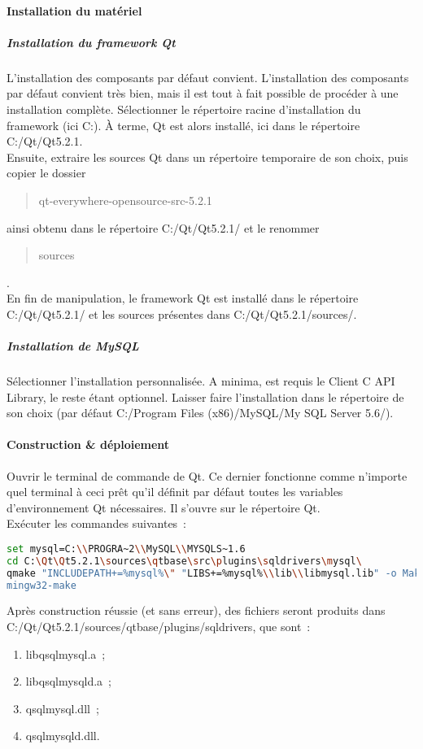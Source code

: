 \paragraph{Installation du matériel}
\subparagraph{Installation du framework Qt}
L'installation des composants par défaut convient.
L'installation des composants par défaut convient très bien, mais il est tout à fait possible de procéder à une installation complète.
Sélectionner le répertoire racine d'installation du framework (ici C:).
À terme, Qt est alors installé, ici dans le répertoire C:/Qt/Qt5.2.1.
\\
Ensuite, extraire les sources Qt dans un répertoire temporaire de son choix, puis copier le dossier \begin{quote}qt-everywhere-opensource-src-5.2.1\end{quote} ainsi obtenu dans le répertoire C:/Qt/Qt5.2.1/ et le renommer \begin{quote}sources\end{quote}.
\\
En fin de manipulation, le framework Qt est installé dans le répertoire C:/Qt/Qt5.2.1/ et les sources présentes dans C:/Qt/Qt5.2.1/sources/.

\subparagraph{Installation de MySQL}
Sélectionner l'installation personnalisée.
A minima, est requis le {\quote Client C API Library}, le reste étant optionnel.
Laisser faire l'installation dans le répertoire de son choix (par défaut C:/Program Files (x86)/MySQL/My SQL Server 5.6/).

\paragraph{Construction \& déploiement}
Ouvrir le terminal de commande de Qt.
Ce dernier fonctionne comme n'importe quel terminal à ceci prêt qu'il définit par défaut toutes les variables d'environnement Qt nécessaires.
Il s'ouvre sur le répertoire Qt.
\\
Exécuter les commandes suivantes~:
\begin{lstlisting}[language=Bash]
set mysql=C:\\PROGRA~2\\MySQL\\MYSQLS~1.6
cd C:\Qt\Qt5.2.1\sources\qtbase\src\plugins\sqldrivers\mysql\
qmake "INCLUDEPATH+=%mysql%\" "LIBS+=%mysql%\\lib\\libmysql.lib" -o Makefile mysql.pro
mingw32-make
\end{lstlisting}
Après construction réussie (et sans erreur), des fichiers seront produits dans C:/Qt/Qt5.2.1/sources/qtbase/plugins/sqldrivers, que sont~:
\begin{enumerate}
	\item libqsqlmysql.a~;
	\item libqsqlmysqld.a~;
	\item qsqlmysql.dll~;
	\item qsqlmysqld.dll.
\end{enumerate}


